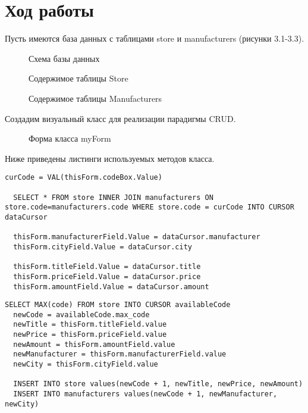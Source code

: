 \section{Ход работы}

Пусть имеются база данных с таблицами store и manufacturers (рисунки 3.1-3.3).

\begin{figure}[h!t]
  \caption{Схема базы данных}
\end{figure}

\begin{figure}[h!t]
  \caption{Содержимое таблицы Store}
\end{figure}

\begin{figure}[h!t]
  \caption{Содержимое таблицы Manufacturers}
\end{figure}

\pagebreak

Создадим визуальный класс для реализации парадигмы CRUD.

\begin{figure}[ht]
  \caption{Форма класса myForm}
\end{figure}

Ниже приведены листинги используемых методов класса.

\begin{lstlisting}[float=h,caption=myForm.getData]
  curCode = VAL(thisForm.codeBox.Value)

  SELECT * FROM store INNER JOIN manufacturers ON store.code=manufacturers.code WHERE store.code = curCode INTO CURSOR dataCursor

  thisForm.manufacturerField.Value = dataCursor.manufacturer
  thisForm.cityField.Value = dataCursor.city

  thisForm.titleField.Value = dataCursor.title
  thisForm.priceField.Value = dataCursor.price
  thisForm.amountField.Value = dataCursor.amount
\end{lstlisting}

\begin{lstlisting}[float=h,caption=myForm.insertData]
  SELECT MAX(code) FROM store INTO CURSOR availableCode
  newCode = availableCode.max_code
  newTitle = thisForm.titleField.value
  newPrice = thisForm.priceField.value
  newAmount = thisForm.amountField.value
  newManufacturer = thisForm.manufacturerField.value
  newCity = thisForm.cityField.value

  INSERT INTO store values(newCode + 1, newTitle, newPrice, newAmount)
  INSERT INTO manufacturers values(newCode + 1, newManufacturer, newCity)
\end{lstlisting}

